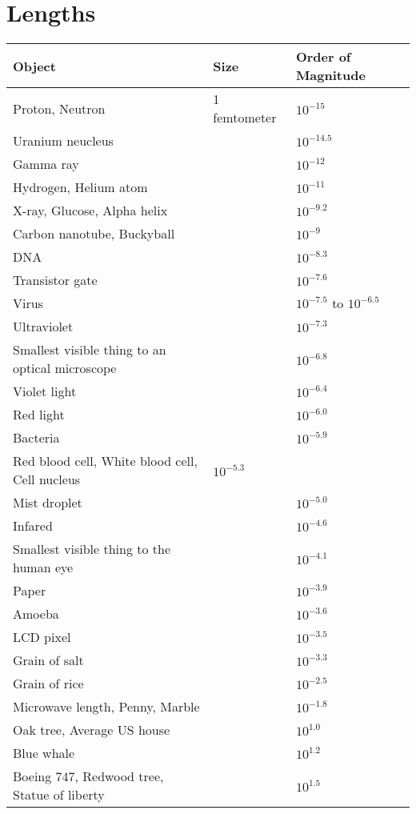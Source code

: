 \documentclass{article}
\begin{document}
\section{Lengths}
	\begin{longtabu} to 0.75\linewidth { X X X }
		Object & Size & Order of Magnitude \\
		\hline
		Proton, Neutron & 1 femtometer  & $10^{-15}$ \\
		Uranium neucleus & & $10^{-14.5}$ \\
		Gamma ray & & $10^{-12}$ \\
		Hydrogen, Helium atom & & $10^{-11}$ \\
		X-ray, Glucose, Alpha helix & & $10^{-9.2}$ \\
		Carbon nanotube, Buckyball & & $10^{-9}$ \\
		DNA & & $10^{-8.3}$ \\
		Transistor gate & & $10^{-7.6}$ \\
		Virus & & $10^{-7.5}$ to $10^{-6.5}$ \\
		Ultraviolet & & $10^{-7.3}$ \\
		Smallest visible thing to an optical microscope & & $10^{-6.8}$ \\
		Violet light & & $10^{-6.4}$ \\
		Red light & & $10^{-6.0}$ \\
		Bacteria & & $10^{-5.9}$ \\
		Red blood cell, White blood cell, Cell nucleus & $10^{-5.3}$ \\
		Mist droplet & & $10^{-5.0}$ \\
		Infared & & $10^{-4.6}$ \\
		Smallest visible thing to the human eye & & $10^{-4.1}$ \\
		Paper & & $10^{-3.9}$ \\
		Amoeba & & $10^{-3.6}$ \\
		LCD pixel & & $10^{-3.5}$ \\
		Grain of salt & & $10^{-3.3}$ \\
		Grain of rice & & $10^{-2.5}$ \\
		Microwave length, Penny, Marble & & $10^{-1.8}$ \\
		Oak tree, Average US house & & $10^{1.0}$ \\
		Blue whale & & $10^{1.2}$ \\
		Boeing 747, Redwood tree, Statue of liberty & & $10^{1.5}$ \\

\end{longtabu}
\end{document}
